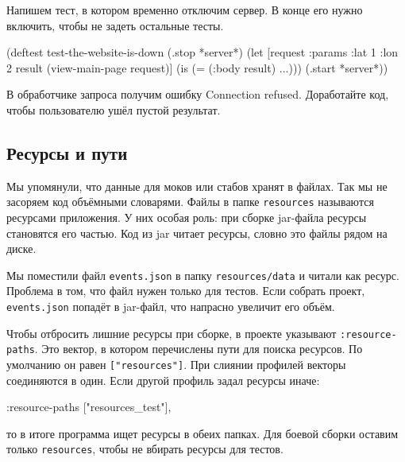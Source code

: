 \fi

Напишем тест, в котором временно отключим сервер. В конце его нужно включить,
чтобы не задеть остальные тесты.

\begin{english}
  \begin{clojure}
(deftest test-the-website-is-down
  (.stop *server*)
  (let [request {:params {:lat 1 :lon 2}}
        result (view-main-page request)]
    (is (= (:body result) {...})))
  (.start *server*))
  \end{clojure}
\end{english}

В обработчике запроса получим ошибку Connection refused. Доработайте код,
чтобы пользователю ушёл пустой результат.

\subsection{Ресурсы и пути}

\label{resources}


Мы упомянули, что данные для моков или стабов хранят в файлах. Так мы не
засоряем код объёмными словарями. Файлы в папке \verb|resources| называются
ресурсами приложения. У них особая роль: при сборке jar-файла ресурсы становятся
его частью. Код из jar читает ресурсы, словно это файлы рядом на диске.

Мы поместили файл \verb|events.json| в папку \verb|resources/data| и читали
как ресурс. Проблема в том, что файл нужен только для тестов. Если собрать
проект, \verb|events.json| попадёт в jar-файл, что напрасно увеличит его
объём.

Чтобы отбросить лишние ресурсы при сборке, в проекте указывают
\verb|:resource-paths|. Это вектор, в котором перечислены пути для поиска
ресурсов. По умолчанию он равен \verb|["resources"]|. При слиянии профилей
векторы соединяются в один. Если другой профиль задал ресурсы иначе:

\begin{english}
  \begin{clojure}
:resource-paths ["resources_test"],
  \end{clojure}
\end{english}

\noindent
то в итоге программа ищет ресурсы в обеих папках. Для боевой сборки оставим
только \verb|resources|, чтобы не вбирать ресурсы для тестов.

